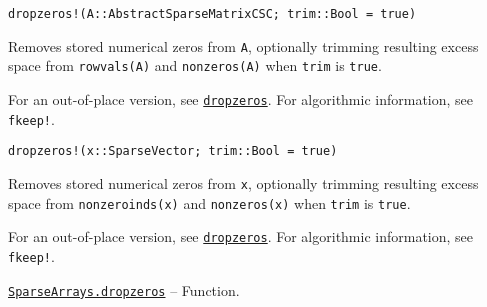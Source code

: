 \begin{adjustwidth}{2em}{0pt}


\begin{verbatim}
dropzeros!(A::AbstractSparseMatrixCSC; trim::Bool = true)
\end{verbatim}

Removes stored numerical zeros from \texttt{A}, optionally trimming resulting excess space from \texttt{rowvals(A)} and \texttt{nonzeros(A)} when \texttt{trim} is \texttt{true}.

For an out-of-place version, see \hyperlink{10222793754853330762}{\texttt{dropzeros}}. For algorithmic information, see \texttt{fkeep!}.




\begin{lstlisting}
dropzeros!(x::SparseVector; trim::Bool = true)
\end{lstlisting}

Removes stored numerical zeros from \texttt{x}, optionally trimming resulting excess space from \texttt{nonzeroinds(x)} and \texttt{nonzeros(x)} when \texttt{trim} is \texttt{true}.

For an out-of-place version, see \hyperlink{10222793754853330762}{\texttt{dropzeros}}. For algorithmic information, see \texttt{fkeep!}.



\end{adjustwidth}
\hypertarget{10222793754853330762}{} 
\hyperlink{10222793754853330762}{\texttt{SparseArrays.dropzeros}}  -- {Function.}

